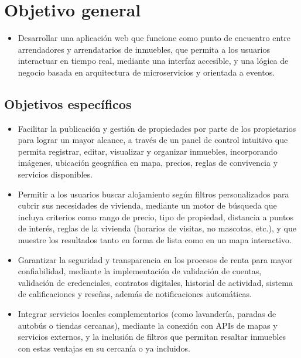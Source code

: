 \section{Objetivo general}
	\begin{itemize}
		\item Desarrollar una aplicación web que funcione como punto de encuentro entre arrendadores y arrendatarios de inmuebles, que permita a los usuarios interactuar en tiempo real, mediante una interfaz accesible, y una lógica de negocio basada en arquitectura de microservicios y orientada a eventos.
	\end{itemize}

	\subsection{Objetivos específicos}
		\begin{itemize}
			\item Facilitar la publicación y gestión de propiedades por parte de los propietarios para lograr un mayor alcance, a través de un panel de control intuitivo que permita registrar, editar, visualizar y organizar inmuebles, incorporando imágenes, ubicación geográfica en mapa, precios, reglas de convivencia y servicios disponibles.
			\item Permitir a los usuarios buscar alojamiento según filtros personalizados para cubrir sus necesidades de vivienda, mediante un motor de búsqueda que incluya criterios como rango de precio, tipo de propiedad, distancia a puntos de interés, reglas de la vivienda (horarios de visitas, no mascotas, etc.), y que muestre los resultados tanto en forma de lista como en un mapa interactivo.
			\item Garantizar la seguridad y transparencia en los procesos de renta para mayor confiabilidad, mediante la implementación de validación de cuentas, validación de credenciales, contratos digitales, historial de actividad, sistema de calificaciones y reseñas, además de notificaciones automáticas.
			\item Integrar servicios locales complementarios (como lavandería, paradas de autobús o tiendas cercanas), mediante la conexión con APIs de mapas y servicios externos, y la inclusión de filtros que permitan resaltar inmuebles con estas ventajas en su cercanía o ya incluidos.
		\end{itemize}